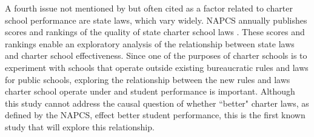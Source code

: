 \documentclass[letterpaper,12p,twoside]{article} %
\begin{document}
A fourth issue not mentioned by  but often cited as a factor related to charter school performance are state laws, which vary widely. NAPCS annually publishes scores and rankings of the quality of state charter school laws \cite{NAPCS2010a,NAPCS2012}. These scores and rankings enable an exploratory analysis of the relationship between state laws and charter school effectiveness. Since one of the purposes of charter schools is to experiment with schools that operate outside existing bureaucratic rules and laws for public schools, exploring the relationship between the new rules and laws charter school operate under and student performance is important. Although this study cannot address the causal question of whether ``better" charter laws, as defined by the NAPCS, effect better student performance, this is the first known study that will explore this relationship.


\end{document}
